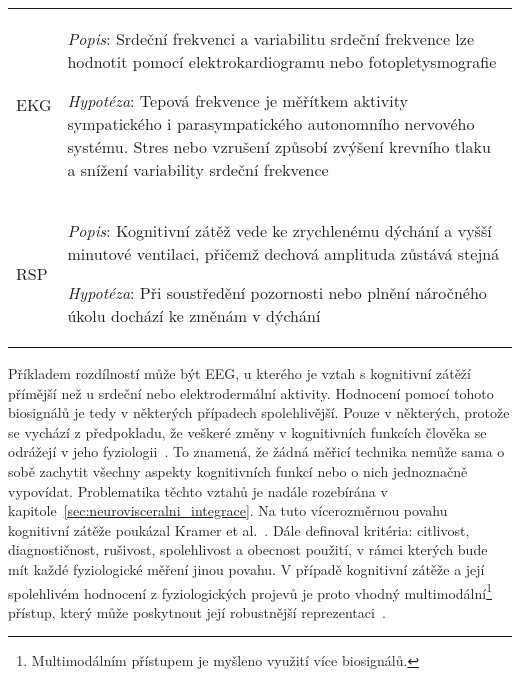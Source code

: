 \begin{table}[!htb]
\begin{threeparttable}
\begin{tabular}{p{3cm}p{11cm}}
            \\
            EKG                 & \textit{Popis}: Srdeční frekvenci a variabilitu srdeční frekvence lze hodnotit pomocí elektrokardiogramu nebo fotopletysmografie\newline
            \rule{0pt}{2.5ex}\noindent
            \textit{Hypotéza}: Tepová frekvence je měřítkem aktivity sympatického i parasympatického autonomního nervového systému. Stres nebo vzrušení způsobí zvýšení krevního tlaku a snížení variability srdeční frekvence~\cite{Jercic2020,Solhjoo2019}
            \\
            RSP                 & \textit{Popis}: Kognitivní zátěž vede ke zrychlenému dýchání a vyšší minutové ventilaci, přičemž dechová amplituda zůstává stejná\newline
            \rule{0pt}{2.5ex}\noindent
            \textit{Hypotéza}: Při soustředění pozornosti nebo plnění náročného úkolu dochází ke změnám v dýchání~\cite{Grassmann2016}
            \\
            \bottomrule
        \end{tabular}
    \end{threeparttable}
\end{table}

Příkladem rozdílností může být EEG, u kterého je vztah s kognitivní zátěží
přímější než u srdeční nebo elektrodermální aktivity. Hodnocení pomocí tohoto
biosignálů je tedy v některých případech spolehlivější. Pouze v některých,
protože se vychází z předpokladu, že veškeré změny v kognitivních funkcích
člověka se odrážejí v jeho fyziologii~\cite{Vanneste2021}. To znamená, že žádná
měřicí technika nemůže sama o sobě zachytit všechny aspekty kognitivních funkcí
nebo o nich jednoznačně vypovídat. Problematika těchto vztahů je nadále
rozebírána v kapitole~\ref{sec:neurovisceralni_integrace}. Na tuto vícerozměrnou
povahu kognitivní zátěže poukázal Kramer et al.~\cite{Kramer1991}. Dále
definoval kritéria: citlivost, diagnostičnost, rušivost, spolehlivost a obecnost
použití, v rámci kterých bude mít každé fyziologické měření jinou povahu. V
případě kognitivní zátěže a její spolehlivém hodnocení z fyziologických projevů
je proto vhodný multimodální\footnote{Multimodálním přístupem je myšleno využití
více biosignálů.} přístup, který může poskytnout její robustnější
reprezentaci~\cite{Chen2016}.

